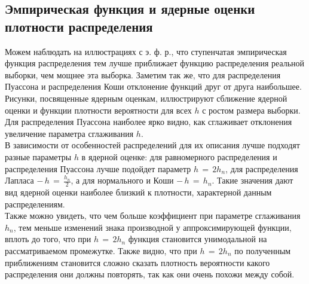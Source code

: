 \subsection{Эмпирическая функция и ядерные оценки плотности распределения}
\begin{flushleft}
	Можем наблюдать на иллюстрациях с э. ф. р., что ступенчатая эмпирическая функция распределения тем лучше приближает функцию распределения реальной выборки, чем мощнее эта выборка. Заметим так же, что для распределения Пуассона и распределения Коши отклонение функций друг от друга наибольшее.\\
	Рисунки, посвященные ядерным оценкам, иллюстрируют сближение ядерной оценки и функции плотности вероятности для всех $h$ с ростом размера выборки. Для распределения Пуассона наиболее ярко видно, как сглаживает отклонения увеличение параметра сглаживания $h$.\\
	В зависимости от особенностей распределений для их описания лучше подходят разные параметры $h$ в ядерной оценке: для равномерного распределения и распределения Пуассона лучше подойдет параметр $h \,=\, 2h_n$, для	распределения Лапласа $-\, h \,=\, \frac{h_n}{2}$, а для нормального и Коши $-\, h \,=\, h_n$. Такие значения дают вид ядерной оценки наиболее близкий к плотности, характерной данным распределениям.\\
	Также можно увидеть, что чем больше коэффициент при параметре сглаживания $h_n$, тем меньше изменений знака производной у аппроксимирующей функции, вплоть до того, что при $h \,=\, 2h_n$ функция становится унимодальной на рассматриваемом промежутке. Также видно, что при $h \,=\, 2h_n$	по полученным приближениям становится сложно сказать плотность вероятности какого распределения они должны повторять, так как они очень похожи между собой.
\end{flushleft}